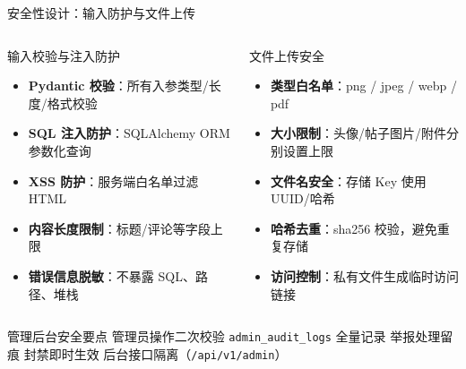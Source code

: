 \documentclass[aspectratio=169,UTF8]{ctexbeamer}
\begin{document}
\begin{frame}{安全性设计：输入防护与文件上传}
    \begin{columns}[T]
        \begin{block}{输入校验与注入防护}
            \begin{itemize}
                \item \textbf{Pydantic 校验}：所有入参类型/长度/格式校验
                \item \textbf{SQL 注入防护}：SQLAlchemy ORM 参数化查询
                \item \textbf{XSS 防护}：服务端白名单过滤 HTML
                \item \textbf{内容长度限制}：标题/评论等字段上限
                \item \textbf{错误信息脱敏}：不暴露 SQL、路径、堆栈
            \end{itemize}
        \end{block}
        \begin{block}{文件上传安全}
            \begin{itemize}
                \item \textbf{类型白名单}：png / jpeg / webp / pdf
                \item \textbf{大小限制}：头像/帖子图片/附件分别设置上限
                \item \textbf{文件名安全}：存储 Key 使用 UUID/哈希
                \item \textbf{哈希去重}：sha256 校验，避免重复存储
                \item \textbf{访问控制}：私有文件生成临时访问链接
            \end{itemize}
        \end{block}
    \end{columns}
    \vspace{0.1cm}
    \begin{alertblock}{管理后台安全要点}
        管理员操作二次校验 \textbullet{} \texttt{admin\_audit\_logs} 全量记录 \textbullet{} 举报处理留痕 \textbullet{} 封禁即时生效 \textbullet{} 后台接口隔离（\texttt{/api/v1/admin}）
    \end{alertblock}
\end{frame}
\end{document}
